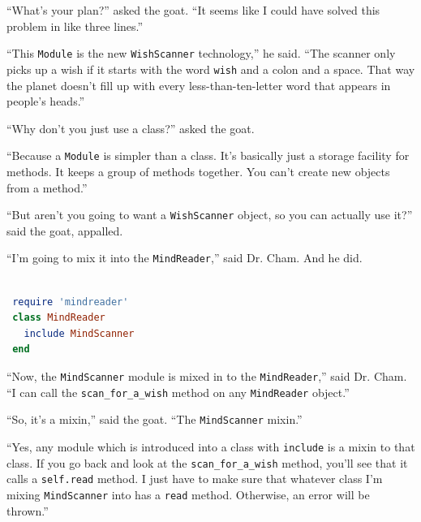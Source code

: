 \documentclass[10pt,twoside]{report}
\begin{document}
``What's your plan?'' asked the goat.  ``It seems like I could have
solved this problem in like three lines.''

``This \lstinline[breaklines=true]|Module| is the new
\lstinline[breaklines=true]|WishScanner| technology,'' he said.  ``The
scanner only picks up a wish if it starts with the word
\lstinline[breaklines=true]|wish| and a colon and a space.  That way
the planet doesn't fill up with every less-than-ten-letter word that
appears in people's heads.''

``Why don't you just use a class?'' asked the goat.

``Because a \lstinline[breaklines=true]|Module| is simpler than a
class.  It's basically just a storage facility for methods.  It keeps
a group of methods together.  You can't create new objects from a
method.''

``But aren't you going to want a
\lstinline[breaklines=true]|WishScanner| object, so you can actually
use it?'' said the goat, appalled.

``I'm going to mix it into the
\lstinline[breaklines=true]|MindReader|,'' said Dr. Cham.  And he did.


\begin{lstlisting}[basicstyle=\ttfamily\color{basiccolor},
    commentstyle = \ttfamily\color{commentcolor},
    keywordstyle=\ttfamily\color{keywordscolor},
    stringstyle=\color{stringcolor},
    language=Ruby,
    basicstyle=\small\ttfamily,
    showstringspaces=false,
  ]

 require 'mindreader'
 class MindReader
   include MindScanner
 end

\end{lstlisting}


``Now, the \lstinline[breaklines=true]|MindScanner| module is mixed in
to the \lstinline[breaklines=true]|MindReader|,'' said Dr. Cham. ``I
can call the \lstinline[breaklines=true]|scan_for_a_wish| method on
any \lstinline[breaklines=true]|MindReader| object.''

``So, it's a mixin,'' said the goat.  ``The
\lstinline[breaklines=true]|MindScanner| mixin.''

``Yes, any module which is introduced into a class with
\lstinline[breaklines=true]|include| is a mixin to that class.  If you
go back and look at the \lstinline[breaklines=true]|scan_for_a_wish|
method, you'll see that it calls a
\lstinline[breaklines=true]|self.read| method.  I just have to make
sure that whatever class I'm mixing
\lstinline[breaklines=true]|MindScanner| into has a
\lstinline[breaklines=true]|read| method.  Otherwise, an error will be
thrown.''
\end{document}
